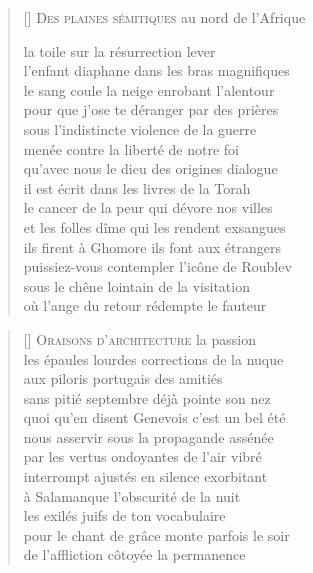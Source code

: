 \documentclass[a4paper, titlepage, twoside, 12pt]{book}
\begin{document}
\newpage

\vspace*{2cm}
\settowidth{\versewidth}{la toile sur la résurrection lever}
\begin{verse}[\versewidth]
{\lettrine[lines=1]{\textcolor[gray]{0.6}{D}}{\space es plaines sémitiques}} au nord de l'Afrique

la toile sur la résurrection lever\\
l'enfant diaphane dans les bras magnifiques\\
le sang coule la neige enrobant l'alentour\\
pour que j'ose te déranger par des prières\\
sous l'indistincte violence de la guerre\\
menée contre la liberté de notre foi\\
qu'avec nous le dieu des origines dialogue\\
il est écrit dans les livres de la Torah\\
le cancer de la peur qui dévore nos villes\\
et les folles dîme qui les rendent exsangues\\
ils firent à Ghomore ils font aux étrangers\\
puissiez-vous contempler l'icône de Roublev\\
sous le chêne lointain de la visitation\\
où l'ange du retour rédempte le fauteur 
\end{verse}
\newpage


\vspace*{2cm}
\settowidth{\versewidth}{les épaules lourdes corrections de la nuque}
\begin{verse}[\versewidth]
{\lettrine[lines=1]{\textcolor[gray]{0.6}{O}}{\space raisons d'architecture}}  la passion\\
les épaules lourdes corrections de la nuque\\
aux piloris portugais des amitiés\\
sans pitié septembre déjà pointe son nez\\
quoi qu'en disent Genevois c'est un bel été\\
nous asservir sous la propagande assénée\\
par les vertus ondoyantes de l'air vibré\\
interrompt ajustés en silence exorbitant\\
à Salamanque l'obscurité de la nuit\\
les exilés juifs de ton vocabulaire\\
pour le chant de grâce monte parfois le soir\\
de l'affliction côtoyée la permanence 
\end{verse}
\end{document}
